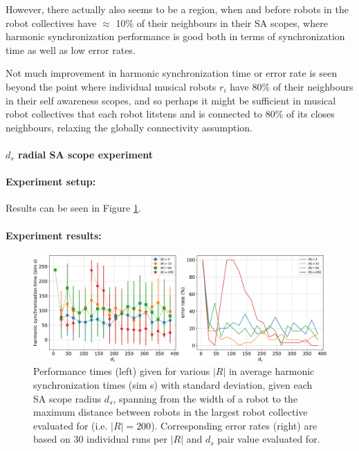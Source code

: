 				However, there actually also seems to be a region, when and before robots in the robot collectives have $\approx$ 10\% of their neighbours in their SA scopes, where harmonic synchronization performance is good both in terms of synchronization time as well as low error rates.
				
				Not much improvement in harmonic synchronization time or error rate is seen beyond the point where individual musical robots $r_i$ have 80\% of their neighbours in their self awareness scopes, and so perhaps it might be sufficient in musical robot collectives that each robot litstens and is connected to 80\% of its closes neighbours, relaxing the globally connectivity assumption.
				
			
			\paragraph{$d_s$ radial SA scope experiment}
				
				\paragraph{Experiment setup:\nl}
				
				Results can be seen in Figure \ref{fig:phase_and_freq_sync_d_s_SA_scope_tuning}.
				
				\paragraph{Experiment results:\nl}
				
				\begin{figure}[ht!]
					\centering
					\includegraphics[width=\linewidth]{Assets/DocSegments/Chapters/ExperimentsAndResults/Figures/PerfScores/phase_and_freq_sync_d_s_SA_scope_tuning_experiment_performance.pdf}
					\caption[Experiment results for $\phi$ \& $\omega$ synchronization $d_s$ SA scope tuning experiment.]{Performance times (left) given for various $|R|$ in average harmonic synchronization times (sim s) with standard deviation, given each SA scope radius $d_s$, spanning from the width of a robot to the maximum distance between robots in the largest robot collective evaluated for (i.e. $|R|=200$). Corresponding error rates (right) are based on 30 individual runs per $|R|$ and $d_s$ pair value evaluated for.}
					\label{fig:phase_and_freq_sync_d_s_SA_scope_tuning}
				\end{figure}
				
